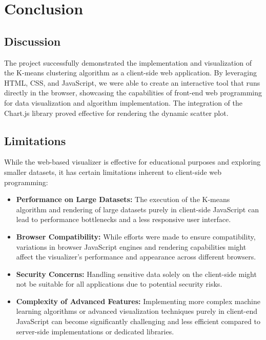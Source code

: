 \documentclass[12pt]{report}
\begin{document}
\newpage
\chapter{Conclusion}

\section{Discussion}
The project successfully demonstrated the implementation and visualization of the K-means clustering algorithm as a client-side web application. By leveraging HTML, CSS, and JavaScript, we were able to create an interactive tool that runs directly in the browser, showcasing the capabilities of front-end web programming for data visualization and algorithm implementation. The integration of the Chart.js library proved effective for rendering the dynamic scatter plot.
\section{Limitations}
While the web-based visualizer is effective for educational purposes and exploring smaller datasets, it has certain limitations inherent to client-side web programming:
\begin{itemize}
    \item \textbf{Performance on Large Datasets:} The execution of the K-means algorithm and rendering of large datasets purely in client-side JavaScript can lead to performance bottlenecks and a less responsive user interface.
    \item \textbf{Browser Compatibility:} While efforts were made to ensure compatibility, variations in browser JavaScript engines and rendering capabilities might affect the visualizer's performance and appearance across different browsers.
    \item \textbf{Security Concerns:} Handling sensitive data solely on the client-side might not be suitable for all applications due to potential security risks.
    \item \textbf{Complexity of Advanced Features:} Implementing more complex machine learning algorithms or advanced visualization techniques purely in client-end JavaScript can become significantly challenging and less efficient compared to server-side implementations or dedicated libraries.
\end{itemize}
\end{document}

